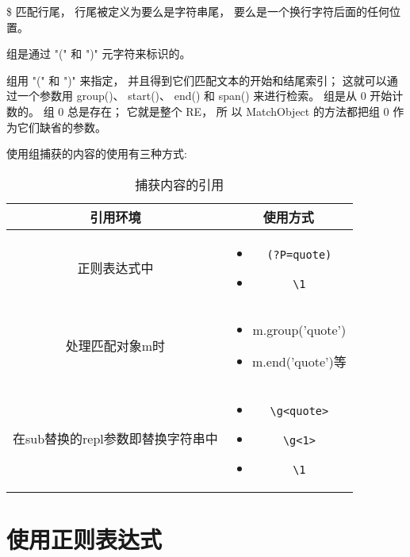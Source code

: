 \documentclass[twoside,11pt]{book}
\begin{document}
\$ 匹配行尾， 行尾被定义为要么是字符串尾， 要么是一个换行字符后面的任何位置。

组是通过 "(" 和 ")" 元字符来标识的。

组用 "(" 和 ")" 来指定， 并且得到它们匹配文本的开始和结尾索引； 这就可以通过一个参数用 group()、
start()、 end() 和 span() 来进行检索。 组是从 0 开始计数的。 组 0 总是存在； 它就是整个 RE， 所
以 MatchObject 的方法都把组 0 作为它们缺省的参数。

使用组捕获的内容的使用有三种方式:
\begin{table}[!htb]
\caption{捕获内容的引用}
\centering
\begin{tabular}{|c|c|}
  \hline
  引用环境 & 使用方式 \\ \hline
  正则表达式中 & \begin{minipage}[c]{4cm}\begin{itemize}
             \item \verb|(?P=quote)|
             \item \verb|\1|
           \end{itemize}\end{minipage} \\ \hline
  处理匹配对象m时 & \begin{minipage}[c]{4cm}\begin{itemize}
              \item m.group('quote')
              \item m.end('quote')等
            \end{itemize}\end{minipage}\\ \hline
  在sub替换的repl参数即替换字符串中 & \begin{minipage}[c]{4cm}\begin{itemize}
                          \item \verb|\g<quote>|
                          \item \verb|\g<1>|
                          \item \verb|\1|
                        \end{itemize}\end{minipage}\\  \hline
\end{tabular}
\end{table}



\section{使用正则表达式}
\end{document}
